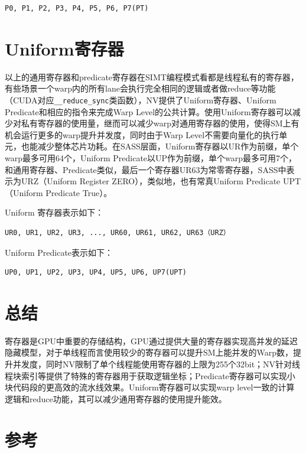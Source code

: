 \begin{lstlisting}
P0, P1, P2, P3, P4, P5, P6, P7(PT)
\end{lstlisting}

\section{Uniform寄存器}

以上的通用寄存器和predicate寄存器在SIMT编程模式看都是线程私有的寄存器，有些场景一个warp内的所有lane会执行完全相同的逻辑或者做reduce等功能（CUDA对应\lstinline|__reduce_sync|类函数），NV提供了Uniform寄存器、Uniform Predicate和相应的指令来完成Warp Level的公共计算。使用Uniform寄存器可以减少对私有寄存器的使用量，继而可以减少warp对通用寄存器的使用，使得SM上有机会运行更多的warp提升并发度，同时由于Warp Level不需要向量化的执行单元，也能减少整体芯片功耗。在SASS层面，Uniform寄存器以UR作为前缀，单个warp最多可用64个，Uniform Predicate以UP作为前缀，单个warp最多可用7个，和通用寄存器、Predicate类似，最后一个寄存器UR63为常零寄存器，SASS中表示为URZ（Uniform Register ZERO），类似地，也有常真Uniform Predicate UPT（Uniform Predicate True）。

Uniform 寄存器表示如下：

\begin{lstlisting}
UR0, UR1, UR2, UR3, ..., UR60, UR61, UR62, UR63（URZ）
\end{lstlisting}

Uniform Predicate表示如下：

\begin{lstlisting}
UP0, UP1, UP2, UP3, UP4, UP5, UP6, UP7(UPT)
\end{lstlisting}

\section{总结}

寄存器是GPU中重要的存储结构，GPU通过提供大量的寄存器实现高并发的延迟隐藏模型，对于单线程而言使用较少的寄存器可以提升SM上能并发的Warp数，提升并发度，同时NV限制了单个线程能使用寄存器的上限为255个32bit；NV针对线程块索引等提供了特殊的寄存器用于获取逻辑坐标；Predicate寄存器可以实现小块代码段的更高效的流水线效果。Uniform寄存器可以实现warp level一致的计算逻辑和reduce功能，其可以减少通用寄存器的使用提升能效。

\section{参考}

